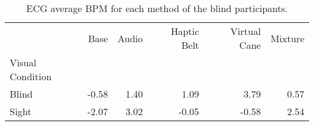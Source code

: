 
\begin{table}[!htb]
\centering
\caption{ECG average BPM  for each method of the blind participants.}
\label{tab:ecg_bpm_average_group_blind}
\begin{tabular}{lrrrrr}
\toprule
{} &   Base & Audio & Haptic Belt & Virtual Cane & Mixture \\
Visual Condition &        &       &             &              &         \\
\midrule
Blind            &  -0.58 &  1.40 &        1.09 &         3.79 &    0.57 \\
Sight            &  -2.07 &  3.02 &       -0.05 &        -0.58 &    2.54 \\
\bottomrule
\end{tabular}
\end{table}

